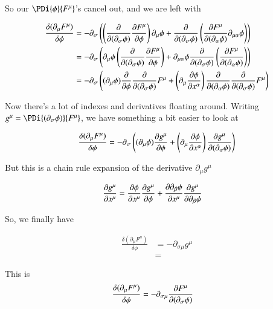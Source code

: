 \documentclass{article}
\begin{document}
So our $\PDi{\phi}{F^\mu}$'s cancel out, and we are left with

\begin{align*}
\frac{\delta (\partial_\mu F^\mu)}{\delta \phi} 
&=
-\partial_\sigma 
\left(
\left(\PD{(\partial_\sigma \phi)}{} \PD{\phi}{F^\mu} \right) \partial_\mu {\phi}
+ 
\PD{(\partial_\sigma \phi)}{} 
\left(
\PD{(\partial_\alpha \phi)}{F^\mu} \partial_{\mu\alpha} \phi 
\right) 
\right) 
\\
&=
-\partial_\sigma 
\left(
\partial_\mu {\phi}
\left(\PD{(\partial_\sigma \phi)}{} \PD{\phi}{F^\mu} \right) 
+ 
\partial_{\mu\alpha} \phi 
\PD{(\partial_\sigma \phi)}{} 
\left(
\PD{(\partial_\alpha \phi)}{F^\mu} 
\right) 
\right) 
\\
&=
-\partial_\sigma 
\left(
(\partial_\mu {\phi})
\PD{\phi}{} 
\PD{(\partial_\sigma \phi)}{}
F^\mu
+ 
\left(\partial_{\mu} 
\PD{x^\alpha}{\phi}\right)
\PD{(\partial_\alpha \phi)}{}
\PD{(\partial_\sigma \phi)}{} 
{F^\mu} 
\right) 
\\
\end{align*}

Now there's a lot of indexes and derivatives floating around.  Writing $g^\mu = \PDi{(\partial_\sigma \phi)}{F^\mu}$, we have something a bit easier to look at

\begin{align*}
\frac{\delta (\partial_\mu F^\mu)}{\delta \phi} 
&=
-\partial_\sigma 
\left(
(\partial_\mu {\phi})
\PD{\phi}{ g^\mu }
+ 
\left(\partial_{\mu} 
\PD{x^\alpha}{\phi}\right)
\PD{(\partial_\alpha \phi)}{ g^\mu }
\right) 
\\
\end{align*}

But this is a chain rule expansion of the 
derivative $\partial_\mu g^\mu$

\begin{align*}
\PD{x^\mu}{g^\mu} &=
\PD{x^\mu}{\phi}\PD{\phi}{g^\mu} 
+ \PD{x^\mu}{\partial_\beta \phi}\PD{\partial_\beta \phi}{g^\mu} 
\end{align*}

So, we finally have

\begin{align*}
\frac{\delta (\partial_\mu F^\mu)}{\delta \phi} 
&=
-\partial_{\sigma \mu} g^\mu \\
&=
\end{align*}

This is
\begin{align}\label{eqn:requiredZeroForSymmetry}
\frac{\delta (\partial_\mu F^\mu)}{\delta \phi} 
&=
-\partial_{\sigma \mu} \PD{(\partial_\sigma \phi)}{F^\mu} 
\end{align}
\end{document}
